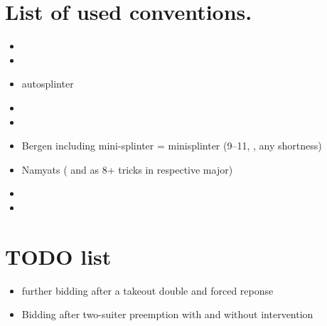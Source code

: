 \documentclass[12pt,a4paper,twoside]{article}
\begin{document}
  \section{List of used conventions.}
  \begin{itemize}
    \item 
    \item 
    \item autosplinter
    \item 
    \item {}
    \item Bergen including mini-splinter \newline
       = minisplinter (9--11, , any shortness)
    \item Namyats ( and  as 8+ tricks in respective major)
    \item 
    \item 
  \end{itemize}

  \section{TODO list}
  \begin{itemize}
    \item further bidding after a takeout double and forced reponse
    \item Bidding after two-suiter preemption with and without intervention
  \end{itemize}
\end{document}
